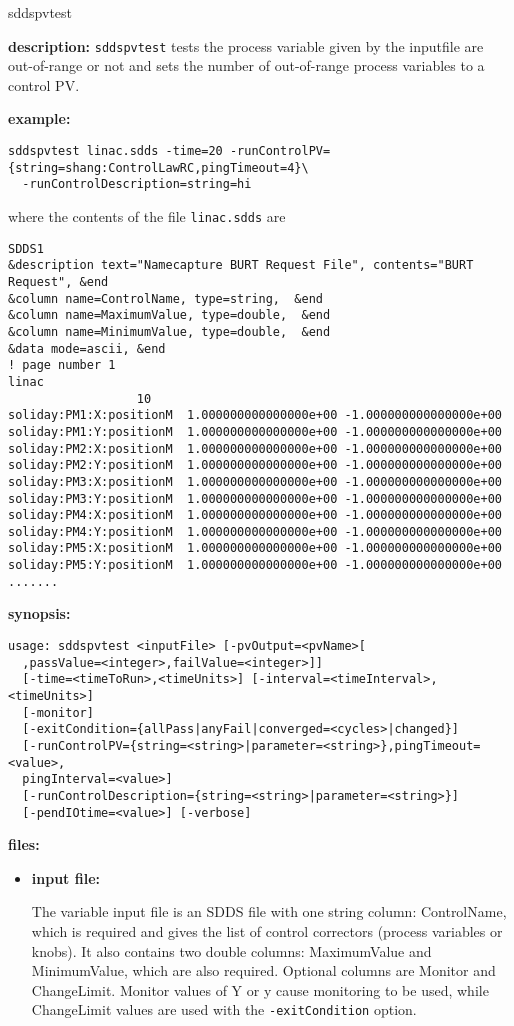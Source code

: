 \begin{sddsprog}{sddspvtest}
\item \textbf{description:}
\verb+sddspvtest+ tests the process variable given by the inputfile are out-of-range
or not and sets the number of out-of-range process variables to a control PV.

\item \textbf{example:} 
% 
\begin{verbatim}
sddspvtest linac.sdds -time=20 -runControlPV={string=shang:ControlLawRC,pingTimeout=4}\
  -runControlDescription=string=hi
\end{verbatim}
where the contents of the file \verb+linac.sdds+ are
\begin{verbatim}
SDDS1
&description text="Namecapture BURT Request File", contents="BURT Request", &end
&column name=ControlName, type=string,  &end
&column name=MaximumValue, type=double,  &end
&column name=MinimumValue, type=double,  &end
&data mode=ascii, &end
! page number 1
linac
                  10
soliday:PM1:X:positionM  1.000000000000000e+00 -1.000000000000000e+00 
soliday:PM1:Y:positionM  1.000000000000000e+00 -1.000000000000000e+00 
soliday:PM2:X:positionM  1.000000000000000e+00 -1.000000000000000e+00 
soliday:PM2:Y:positionM  1.000000000000000e+00 -1.000000000000000e+00 
soliday:PM3:X:positionM  1.000000000000000e+00 -1.000000000000000e+00 
soliday:PM3:Y:positionM  1.000000000000000e+00 -1.000000000000000e+00 
soliday:PM4:X:positionM  1.000000000000000e+00 -1.000000000000000e+00 
soliday:PM4:Y:positionM  1.000000000000000e+00 -1.000000000000000e+00 
soliday:PM5:X:positionM  1.000000000000000e+00 -1.000000000000000e+00 
soliday:PM5:Y:positionM  1.000000000000000e+00 -1.000000000000000e+00 
.......

\end{verbatim}

\item \textbf{synopsis:}
\begin{verbatim}
usage: sddspvtest <inputFile> [-pvOutput=<pvName>[
  ,passValue=<integer>,failValue=<integer>]]
  [-time=<timeToRun>,<timeUnits>] [-interval=<timeInterval>,<timeUnits>]
  [-monitor]
  [-exitCondition={allPass|anyFail|converged=<cycles>|changed}]
  [-runControlPV={string=<string>|parameter=<string>},pingTimeout=<value>,
  pingInterval=<value>]
  [-runControlDescription={string=<string>|parameter=<string>}]
  [-pendIOtime=<value>] [-verbose]
\end{verbatim}
\item \textbf{files:}
\begin{itemize}
\item \textbf{input file:} \par
The variable input file is an SDDS file with one string column: ControlName, which is required
and gives the list of control correctors (process variables or knobs). It also contains two
double columns: MaximumValue and MinimumValue, which are also required. Optional columns
are Monitor and ChangeLimit. Monitor values of Y or y cause monitoring to be used, while
ChangeLimit values are used with the \verb|-exitCondition| option.
\end{itemize}


\end{sddsprog}
